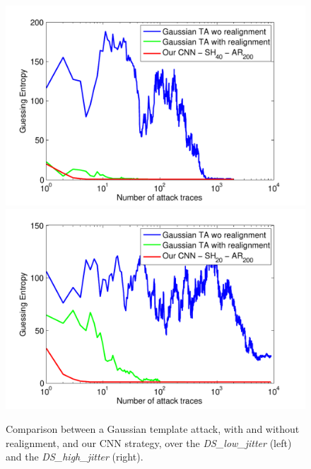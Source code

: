 \begin{figure}
\includegraphics[width=.5\textwidth]{../Figures/CHES2017/results_low_jitter_new.pdf} 
\includegraphics[width=.5\textwidth]{../Figures/CHES2017/results_high_jitter_new.pdf} 
\caption[Comparison between a Gaussian template attack, with and without realignment, and our CNN strategy, over the  \emph{DS\_low\_jitter} and the  \emph{DS\_high\_jitter}.]{Comparison between a Gaussian template attack, with and without realignment, and our CNN strategy, over the  \emph{DS\_low\_jitter} (left) and the  \emph{DS\_high\_jitter} (right).}\label{fig:compareTA}
\end{figure}



